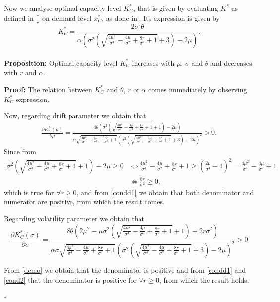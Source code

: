 Now we analyse optimal capacity level $K^*_C$, that is given by evaluating $K^*$ as defined in \eqref{} on demand level $x^*_C$, as done in \cite{huis:cap}. Its expression is given by
$$K^*_C=\frac{2 \sigma ^2 \theta}{\alpha \left(\sigma ^2 \left(\sqrt{\frac{4 \mu ^2}{\sigma ^4}-\frac{4 \mu }{\sigma ^2}+\frac{8 r}{\sigma ^2}+1}+3\right)-2 \mu \right)}.$$\\
\textbf{Proposition:}
Optimal capacity level $K^*_C$ increases with $\mu$, $\sigma$ and $\theta$ and decreases with $r$ and $\alpha$.

\textbf{Proof:}
The relation between $K^*_C$ and $\theta$, $r$ or $\alpha$ comes immediately by observing $K^*_C$ expression.

Now, regarding drift parameter we obtain that
 \begin{align*}
\frac{\partial K^*_C(\mu)}{\partial \mu}=
\frac{4 \theta \left(\sigma ^2 \left(\sqrt{\frac{4 \mu ^2}{\sigma ^4}-\frac{4 \mu }{\sigma ^2}+\frac{8 r}{\sigma ^2}+1}+1\right)-2 \mu \right)}{\alpha \sqrt{\frac{4 \mu ^2}{\sigma ^4}-\frac{4 \mu }{\sigma ^2}+\frac{8 r}{\sigma ^2}+1} \left(\sigma ^2 \left(\sqrt{\frac{4 \mu ^2}{\sigma ^4}-\frac{4 \mu }{\sigma ^2}+\frac{8 r}{\sigma ^2}+1}+3\right)-2 \mu \right)^2}>0.
\end{align*}
Since from
\begin{align}
\label{cond2}
\sigma ^2 \left(\sqrt{\frac{4 \mu ^2}{\sigma ^4}-\frac{4 \mu }{\sigma ^2}+\frac{8 r}{\sigma ^2}+1}+1\right)-2 \mu\geq0 
& \Leftrightarrow
\frac{4 \mu ^2}{\sigma ^4}-\frac{4 \mu }{\sigma ^2}+\frac{8 r}{\sigma ^2}+1 \geq \left( \frac{2 \mu}{\sigma^4}-1 \right)^2=\frac{4 \mu ^2}{\sigma ^4}-\frac{4 \mu }{\sigma ^2}+1 \\
& \Leftrightarrow
\frac{8 r}{\sigma ^2}\geq 0, \nonumber
\end{align}
which is true for $\forall r\geq 0$, and from \eqref{condd1} we obtain that both denominator and numerator are positive, from which the result comes.

Regarding volatility parameter we obtain that
 $$    \frac{\partial K^*_C(\sigma)}{\partial \sigma}= 
\frac{8 \theta \left(2 \mu ^2-\mu  \sigma ^2 \left(\sqrt{\frac{4 \mu ^2}{\sigma ^4}-\frac{4 \mu }{\sigma ^2}+\frac{8 r}{\sigma ^2}+1}+1\right)+2 r \sigma ^2\right)}{\alpha \sigma  \sqrt{\frac{4 \mu ^2}{\sigma ^4}-\frac{4 \mu }{\sigma ^2}+\frac{8 r}{\sigma ^2}+1} \left(\sigma ^2 \left(\sqrt{\frac{4 \mu ^2}{\sigma ^4}-\frac{4 \mu }{\sigma ^2}+\frac{8 r}{\sigma ^2}+1}+3\right)-2 \mu \right)^2}>0$$

From \eqref{demo} we obtain that the denominator is positive and from \eqref{condd1} and \eqref{cond2} that the denominator is positive for $\forall r\geq0$, from which the result holds.
\begin{flushright}
	$\square$
\end{flushright}



